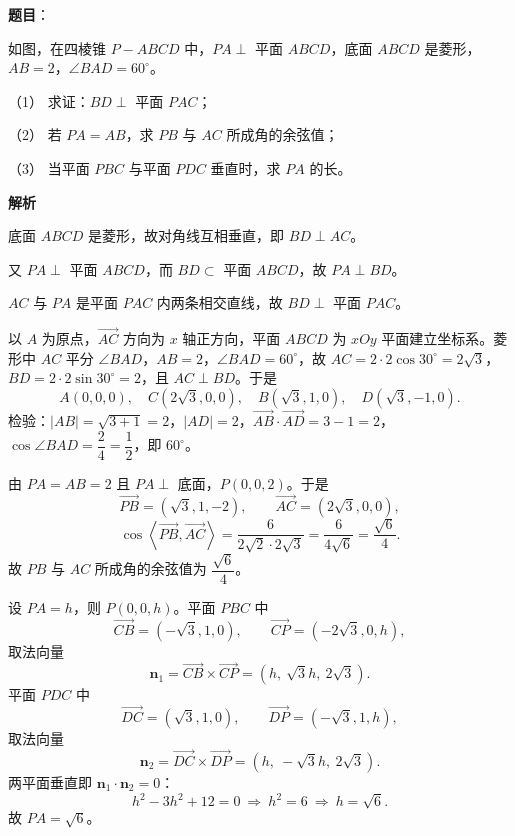 \begin{answer}

\textbf{题目}：

如图，在四棱锥 $P-ABCD$ 中，$PA\perp$ 平面 $ABCD$，底面 $ABCD$ 是菱形，$AB=2$，$\angle BAD=60^\circ$。

（1） 求证：$BD\perp$ 平面 $PAC$；

（2） 若 $PA=AB$，求 $PB$ 与 $AC$ 所成角的余弦值；

（3） 当平面 $PBC$ 与平面 $PDC$ 垂直时，求 $PA$ 的长。
\nopagebreak[4]
\begin{center}\end{center}
\nopagebreak[4]
\textbf{解析}


底面 $ABCD$ 是菱形，故对角线互相垂直，即 $BD\perp AC$。

又 $PA\perp$ 平面 $ABCD$，而 $BD\subset$ 平面 $ABCD$，故 $PA\perp BD$。

$AC$ 与 $PA$ 是平面 $PAC$ 内两条相交直线，故 $BD\perp$ 平面 $PAC$。


以 $A$ 为原点，$\overrightarrow{AC}$ 方向为 $x$ 轴正方向，平面 $ABCD$ 为 $xOy$ 平面建立坐标系。菱形中 $AC$ 平分 $\angle BAD$，$AB=2$，$\angle BAD=60^\circ$，故 $AC=2\cdot2\cos30^\circ=2\sqrt3$，$BD=2\cdot2\sin30^\circ=2$，且 $AC\perp BD$。于是
\nopagebreak[4]
\[
A(0,0,0),\quad C(2\sqrt3,0,0),\quad B(\sqrt3,1,0),\quad D(\sqrt3,-1,0).
\]
检验：$|AB|=\sqrt{3+1}=2$，$|AD|=2$，$\overrightarrow{AB}\cdot\overrightarrow{AD}=3-1=2$，$\cos\angle BAD=\dfrac{2}{4}=\dfrac12$，即 $60^\circ$。

由 $PA=AB=2$ 且 $PA\perp$ 底面，$P(0,0,2)$。于是
\nopagebreak[4]
\[
\overrightarrow{PB}=(\sqrt3,1,-2),\qquad \overrightarrow{AC}=(2\sqrt3,0,0),
\]
\nopagebreak[4]
\[
\cos\left\langle\overrightarrow{PB},\overrightarrow{AC}\right\rangle
=\frac{6}{2\sqrt2\cdot2\sqrt3}
=\frac{6}{4\sqrt6}
=\frac{\sqrt6}{4}.
\]
故 $PB$ 与 $AC$ 所成角的余弦值为 $\dfrac{\sqrt6}{4}$。


设 $PA=h$，则 $P(0,0,h)$。平面 $PBC$ 中
\nopagebreak[4]
\[
\overrightarrow{CB}=(-\sqrt3,1,0),\qquad \overrightarrow{CP}=(-2\sqrt3,0,h),
\]
取法向量
\nopagebreak[4]
\[
\boldsymbol n_1=\overrightarrow{CB}\times\overrightarrow{CP}=(h,\ \sqrt3h,\ 2\sqrt3).
\]
平面 $PDC$ 中
\nopagebreak[4]
\[
\overrightarrow{DC}=(\sqrt3,1,0),\qquad \overrightarrow{DP}=(-\sqrt3,1,h),
\]
取法向量
\nopagebreak[4]
\[
\boldsymbol n_2=\overrightarrow{DC}\times\overrightarrow{DP}=(h,\ -\sqrt3h,\ 2\sqrt3).
\]
两平面垂直即 $\boldsymbol n_1\cdot\boldsymbol n_2=0$：
\nopagebreak[4]
\[
h^2-3h^2+12=0\ \Longrightarrow\ h^2=6\ \Longrightarrow\ h=\sqrt6.
\]
故 $PA=\sqrt6$。


\end{answer}
